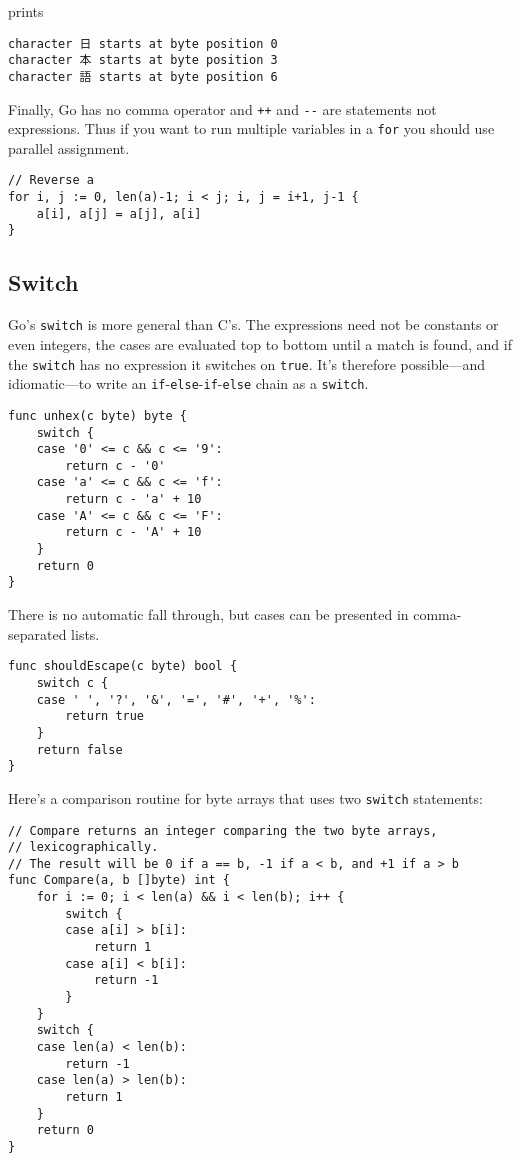 prints

\begin{Verbatim}[frame=single]
character 日 starts at byte position 0
character 本 starts at byte position 3
character 語 starts at byte position 6
\end{Verbatim}

Finally, Go has no comma operator and \texttt{++} and \texttt{-{}-} are
statements not expressions. Thus if you want to run multiple variables
in a \texttt{for} you should use parallel assignment.

\begin{Verbatim}[frame=single]
// Reverse a
for i, j := 0, len(a)-1; i < j; i, j = i+1, j-1 {
    a[i], a[j] = a[j], a[i]
}
\end{Verbatim}

\subsection*{Switch}

Go's \texttt{switch} is more general than C's. The expressions need not
be constants or even integers, the cases are evaluated top to bottom
until a match is found, and if the \texttt{switch} has no expression it
switches on \texttt{true}. It's therefore possible---and idiomatic---to
write an \texttt{if}-\texttt{else}-\texttt{if}-\texttt{else} chain as a
\texttt{switch}.

\begin{Verbatim}[frame=single]
func unhex(c byte) byte {
    switch {
    case '0' <= c && c <= '9':
        return c - '0'
    case 'a' <= c && c <= 'f':
        return c - 'a' + 10
    case 'A' <= c && c <= 'F':
        return c - 'A' + 10
    }
    return 0
}
\end{Verbatim}

There is no automatic fall through, but cases can be presented in
comma-separated lists.

\begin{Verbatim}[frame=single]
func shouldEscape(c byte) bool {
    switch c {
    case ' ', '?', '&', '=', '#', '+', '%':
        return true
    }
    return false
}
\end{Verbatim}

Here's a comparison routine for byte arrays that uses two
\texttt{switch} statements:

\begin{Verbatim}[frame=single]
// Compare returns an integer comparing the two byte arrays,
// lexicographically.
// The result will be 0 if a == b, -1 if a < b, and +1 if a > b
func Compare(a, b []byte) int {
    for i := 0; i < len(a) && i < len(b); i++ {
        switch {
        case a[i] > b[i]:
            return 1
        case a[i] < b[i]:
            return -1
        }
    }
    switch {
    case len(a) < len(b):
        return -1
    case len(a) > len(b):
        return 1
    }
    return 0
}
\end{Verbatim}

